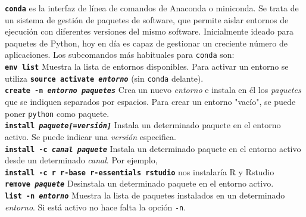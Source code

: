 \documentclass[10pt,landscape,a4paper]{article}
\newcommand{\code}{\texttt}
\newcommand{\bcode}[1]{\texttt{\textbf{#1}}}
\begin{document}
\begin{multicols}{3}
\bcode{conda} es la interfaz de línea de comandos de Anaconda o miniconda. Se trata de un sistema de gestión de paquetes de software, que permite aislar entornos de ejecución con diferentes versiones del mismo software. Inicialmente ideado para paquetes de Python, hoy en día es capaz de gestionar un creciente número de aplicaciones. Los subcomandos más habituales para \code{conda} son:\\
  \bcode{env list} Muestra la lista de entornos disponibles. Para activar un entorno se utiliza \bcode{source activate \emph{entorno}} (sin \code{conda} delante).\\
  \bcode{create -n \emph{entorno} \emph{paquetes}} Crea un nuevo \emph{entorno} e instala en él los \emph{paquetes} que se indiquen separados por espacios. Para crear un entorno "vacío", se puede poner \code{python} como paquete.\\
  \bcode{install \emph{paquete[=versión]}} Instala un determinado paquete en el entorno activo. Se puede indicar una \emph{versión} especifica. \\
  \bcode{install -c \emph{canal} \emph{paquete}} Instala un determinado paquete en el entorno activo desde un determinado \emph{canal}. Por ejemplo,\\ \bcode{install -c r r-base r-essentials rstudio} nos instalaría R y Rstudio\\
  \bcode{remove \emph{paquete}} Desinstala un determinado paquete en el entorno activo.\\
  \bcode{list -n \emph{entorno}} Muestra la lista de paquetes instalados en un determinado \emph{entorno}. Si está activo no hace falta la opción \code{-n}. \\

\end{multicols}
\end{document}
